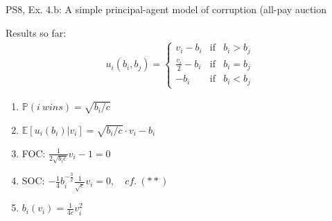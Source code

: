 \begin{frame}{PS8, Ex. 4.b: A simple principal-agent model of corruption (all-pay auction}
\begin{multicols}{2}
\begin{itemize}
      \end{itemize}
      \vspace{-6pt}
      Results so far: \vspace{-6pt}
      \begin{align*}
        u_i(b_i,b_j)=\left\{\begin{array}{lcl}
          v_i-b_i           & \text{if} & b_i>b_j \\
          \frac{v_i}{2}-b_i & \text{if} & b_i=b_j \\
          -b_i              & \text{if} & b_i<b_j
        \end{array}\right.
      \end{align*} \vspace{-16pt}
      \begin{enumerate}
        \item $\mathbb{P}(i\ wins)=\sqrt{b_i/c}$
        \item $\mathbb{E}[u_i(b_i)|v_i]=\sqrt{b_i/c}\cdot v_i-b_i$
        \item FOC: $\frac{1}{2\sqrt{b_ic}}v_i-1=0$
        \item[] SOC: $-\frac{1}{4}b_i^{-\frac{3}{2}}\frac{1}{\sqrt{c}}v_i=0,\quad cf.\ (**)$
        \item $b_i(v_i)=\frac{1}{4c}v_i^2$
      \end{enumerate}
      \vfill\null
    \end{multicols}
\end{frame}
